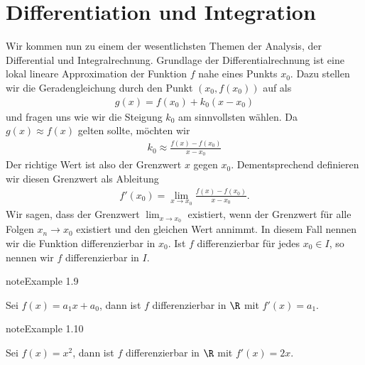 \documentclass[letterpaper,10pt,english]{jupyterBook}
\begin{document}
\section{Differentiation und Integration}
\label{\detokenize{vorkurs/diffnint:differentiation-und-integration}}\label{\detokenize{vorkurs/diffnint::doc}}
Wir kommen nun zu einem der wesentlichsten Themen der Analysis, der Differential\sphinxhyphen{} und Integralrechnung. Grundlage der Differentialrechnung ist eine lokal lineare Approximation der Funktion \(f\) nahe eines Punkts \(x_0\). Dazu stellen wir die Geradengleichung durch den Punkt \((x_0,f(x_0))\) auf als
\begin{equation*}
\begin{split} g(x) = f(x_0) + k_0 (x-x_0) \end{split}
\end{equation*}
und fragen uns wie wir die Steigung \(k_0\) am sinnvollsten wählen. Da \(g(x) \approx f(x)\) gelten sollte, möchten wir
\begin{equation*}
\begin{split} k_0 \approx \frac{f(x) - f(x_0)}{x-x_0} \end{split}
\end{equation*}
Der richtige Wert ist also der Grenzwert \(x\) gegen \(x_0\).  Dementsprechend definieren wir diesen Grenzwert als Ableitung
\begin{equation*}
\begin{split} f'(x_0) = \lim_{x \rightarrow x_0} \frac{f(x) - f(x_0)}{x-x_0}. \end{split}
\end{equation*}
Wir sagen, dass der Grenzwert \(\lim_{x \rightarrow x_0}\) existiert, wenn der Grenzwert für alle Folgen \(x_n \rightarrow x_0\) existiert und den gleichen Wert annimmt. In diesem Fall nennen wir die Funktion differenzierbar in \(x_0\). Ist \(f\) differenzierbar für jedes \(x_0 \in I\), so nennen wir \(f\) differenzierbar in \(I\).
\label{vorkurs/diffnint:example-0}
\begin{sphinxadmonition}{note}{Example 1.9}



Sei \(f(x) = a_1 x + a_0\), dann ist \(f\) differenzierbar in \(\R\) mit \(f'(x) = a_1\).
\end{sphinxadmonition}
\label{vorkurs/diffnint:example-1}
\begin{sphinxadmonition}{note}{Example 1.10}



Sei \(f(x) = x^2\), dann ist \(f\) differenzierbar in \(\R\) mit \(f'(x) = 2x\).
\end{sphinxadmonition}
\end{document}
